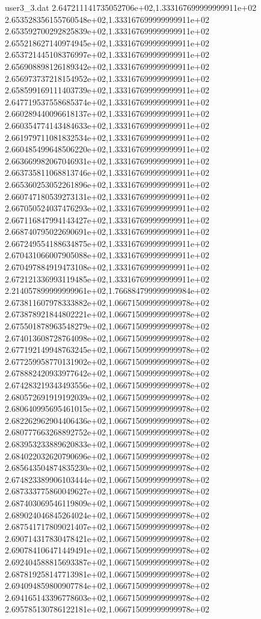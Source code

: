 \begin{filecontents}{user3_3.dat}
2.647211141735052706e+02,1.333167699999999911e+02
2.653528356155760548e+02,1.333167699999999911e+02
2.653592700292825839e+02,1.333167699999999911e+02
2.655218627140974945e+02,1.333167699999999911e+02
2.653721445108376997e+02,1.333167699999999911e+02
2.656908898126189342e+02,1.333167699999999911e+02
2.656973737218154952e+02,1.333167699999999911e+02
2.658599169111403739e+02,1.333167699999999911e+02
2.647719537558685374e+02,1.333167699999999911e+02
2.660289440096618137e+02,1.333167699999999911e+02
2.660354774143484633e+02,1.333167699999999911e+02
2.661979711081832534e+02,1.333167699999999911e+02
2.660485499648506220e+02,1.333167699999999911e+02
2.663669982067046931e+02,1.333167699999999911e+02
2.663735811068813746e+02,1.333167699999999911e+02
2.665360253052261896e+02,1.333167699999999911e+02
2.660747180539273131e+02,1.333167699999999911e+02
2.667050524037476293e+02,1.333167699999999911e+02
2.667116847994143427e+02,1.333167699999999911e+02
2.668740795022690691e+02,1.333167699999999911e+02
2.667249554188634875e+02,1.333167699999999911e+02
2.670431066007905088e+02,1.333167699999999911e+02
2.670497884919473108e+02,1.333167699999999911e+02
2.672121336993119485e+02,1.333167699999999911e+02
2.214057899999999961e+02,1.766884799999999984e+02
2.673811607978333882e+02,1.066715099999999978e+02
2.673878921844802221e+02,1.066715099999999978e+02
2.675501878963548279e+02,1.066715099999999978e+02
2.674013608728764098e+02,1.066715099999999978e+02
2.677192149948763245e+02,1.066715099999999978e+02
2.677259958770131902e+02,1.066715099999999978e+02
2.678882420933977642e+02,1.066715099999999978e+02
2.674283219343493556e+02,1.066715099999999978e+02
2.680572691919192039e+02,1.066715099999999978e+02
2.680640995695461015e+02,1.066715099999999978e+02
2.682262962904406436e+02,1.066715099999999978e+02
2.680777663268892752e+02,1.066715099999999978e+02
2.683953233889620833e+02,1.066715099999999978e+02
2.684022032620790696e+02,1.066715099999999978e+02
2.685643504874835230e+02,1.066715099999999978e+02
2.674823389906103444e+02,1.066715099999999978e+02
2.687333775860049627e+02,1.066715099999999978e+02
2.687403069546119809e+02,1.066715099999999978e+02
2.689024046845264024e+02,1.066715099999999978e+02
2.687541717809021407e+02,1.066715099999999978e+02
2.690714317830478421e+02,1.066715099999999978e+02
2.690784106471449491e+02,1.066715099999999978e+02
2.692404588815693387e+02,1.066715099999999978e+02
2.687819258147713981e+02,1.066715099999999978e+02
2.694094859800907784e+02,1.066715099999999978e+02
2.694165143396778603e+02,1.066715099999999978e+02
2.695785130786122181e+02,1.066715099999999978e+02

\end{filecontents}
